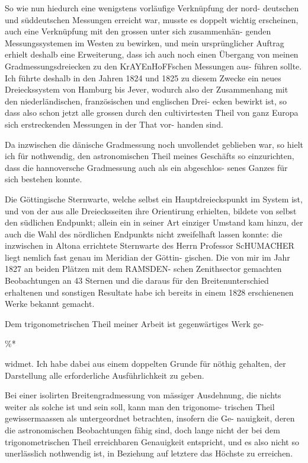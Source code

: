 \documentclass[12pt,a4paper]{article}
\theoremstyle{plain}
\theoremstyle{definition}
\theoremstyle{remark}
\begin{document}
\noindent
So wie nun hiedurch eine wenigstens vorläufige Verknüpfung der nord-
deutschen und süddeutschen Messungen erreicht war, musste es doppelt wichtig
erscheinen, auch eine Verknüpfung mit den grossen unter sich zusammenhän-
genden Messungssystemen im Westen zu bewirken, und mein ursprünglicher
Auftrag erhielt deshalb eine Erweiterung, dass ich auch noch einen Übergang
von meinen Gradmessungsdreiecken zu den KrAYEnHoFFschen Messungen aus-
führen sollte. Ich führte deshalb in den Jahren 1824 und 1825 zu diesem
Zwecke ein neues Dreieckssystem von Hamburg bis Jever, wodurch also der
Zusammenhang mit den niederländischen, französischen und englischen Drei-
ecken bewirkt ist, so dass also schon jetzt alle grossen durch den cultivirtesten
Theil von ganz Europa sich erstreckenden Messungen in der That vor-
handen sind.

\noindent
Da inzwischen die dänische Gradmessung noch unvollendet geblieben
war, so hielt ich für nothwendig, den astronomischen Theil meines Geschäfts
so einzurichten, dass die hannoversche Gradmessung auch als ein abgeschlos-
senes Ganzes für sich bestehen konnte.

\noindent
Die Göttingische Sternwarte, welche selbst ein Hauptdreieckspunkt im
System ist, und von der aus alle Dreiecksseiten ihre Orientirung erhielten,
bildete von selbst den südlichen Endpunkt; allein ein in seiner Art einziger
Umstand kam hinzu, der auch die Wahl des nördlichen Endpunkts nicht
zweifelhaft lassen konnte: die inzwischen in Altona errichtete Sternwarte des
Herrn Professor ScHUMACHER liegt nemlich fast genau im Meridian der Göttin-
gischen. Die von mir im Jahr 1827 an beiden Plätzen mit dem RAMSDEN-
schen Zenithsector gemachten Beobachtungen an 43 Sternen und die daraus
für den Breitenunterschied erhaltenen und sonstigen Resultate habe ich bereits
in einem 1828 erschienenen Werke bekannt gemacht.

\noindent
Dem trigonometrischen Theil meiner Arbeit ist gegenwärtiges Werk ge-

\%*

\noindent

\noindent
widmet. Ich habe dabei aus einem doppelten Grunde für nöthig gehalten,
der Darstellung alle erforderliche Ausführlichkeit zu geben.

\noindent
Bei einer isolirten Breitengradmessung von mässiger Ausdehnung, die
nichts weiter als solche ist und sein soll, kann man den trigonome-
trischen Theil gewissermaassen als untergeordnet betrachten, insofern die Ge-
nauigkeit, deren die astronomischen Beobachtungen fähig sind, doch lange
nicht der bei dem trigonometrischen Theil erreichbaren Genauigkeit entspricht,
und es also nicht so unerlässlich nothwendig ist, in Beziehung auf letztere das
Höchste zu erreichen.
\end{document}
